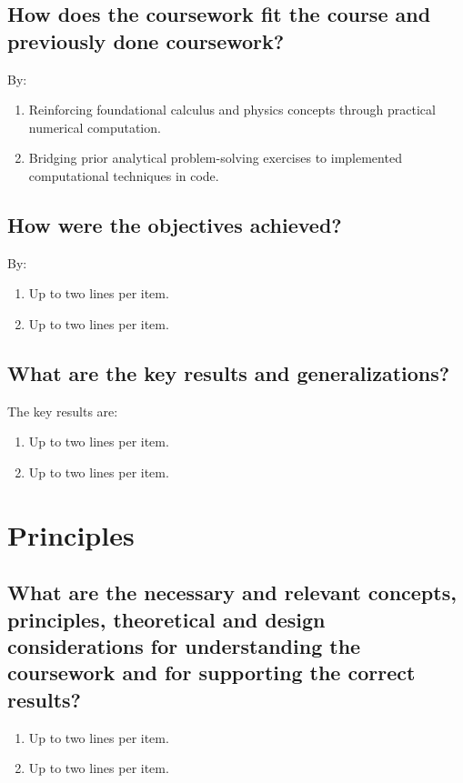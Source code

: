 \subsection{How does the coursework fit the course and previously done coursework?}
By:
\begin{enumerate}
\item Reinforcing foundational calculus and physics concepts through practical numerical computation.
\item Bridging prior analytical problem-solving exercises to implemented computational techniques in code.
\end{enumerate}	


	
\subsection{How were the objectives achieved?}
By:
\begin{enumerate}
\item Up to two lines per item.
\item Up to two lines per item.
\end{enumerate}
	
\subsection{What are the key results and generalizations?}
The key results are:
\begin{enumerate}
\item Up to two lines per item.
\item Up to two lines per item.
\end{enumerate}

 








\section{Principles}
\label{sec:concps}

\subsection{What are the necessary and relevant concepts, principles, theoretical and design considerations for understanding the coursework and for supporting the correct results?}
\label{sec:nrcp}
\begin{enumerate}
\item Up to two lines per item.
\item Up to two lines per item.
\end{enumerate}

